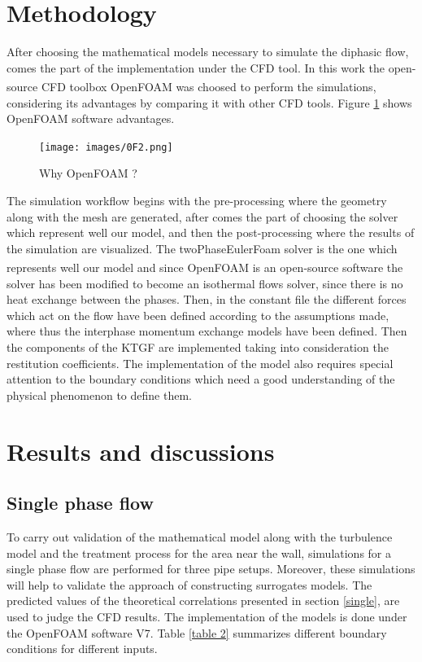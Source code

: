 \documentclass[review,3p,times,12pt]{elsarticle}
\newcommand{\openfoam}{Open\nolinebreak\hspace{-.2em}{\color{blue}\Large$\nabla$}\nolinebreak\hspace{-.2em}FOAM\textsuperscript{\textregistered}\xspace}
\begin{document}
\section{Methodology}
After choosing the mathematical models necessary to simulate the diphasic flow, comes the part of the implementation under the CFD tool. In this work the open-source CFD toolbox \openfoam was choosed to perform the simulations, considering its advantages by comparing it with other CFD tools. Figure \ref{openfoam} shows OpenFOAM software advantages.\\
 \begin{figure}[H]
   \begin{center}
    \texttt{[image: images/0F2.png]}
    \caption{ Why OpenFOAM ?}
    \label{openfoam}
       \end{center}
\end{figure} 
The simulation workflow begins with the pre-processing where the geometry along with the mesh are generated, after comes the part of choosing the solver which represent well our model, and then the post-processing where the results of the simulation are visualized.
The twoPhaseEulerFoam solver is the one which represents well our model and since \openfoam is an open-source software the solver has been modified to become an isothermal flows solver, since there is no heat exchange between the phases. Then, in the constant file the different forces which act on the flow have been defined according to the assumptions made, where thus the interphase momentum exchange models have been defined. Then the components of the KTGF are implemented taking into consideration the restitution coefficients. The implementation of the model also requires special attention to the boundary conditions which need a good understanding of the physical phenomenon to define them.
\section{Results and discussions} \label{results}
\subsection{Single phase flow} \label{single flow}
To carry out validation of the mathematical model along with the turbulence model and the treatment process for the area near the wall, simulations for a single phase flow are performed for three pipe setups. Moreover, these simulations will help to validate the approach of constructing surrogates models. The predicted values of the theoretical correlations presented in section \ref{single}, are used to judge the CFD results. The implementation of the models is done under the OpenFOAM software V7. Table \ref{table 2} summarizes different boundary conditions for different inputs. 
\end{document}
